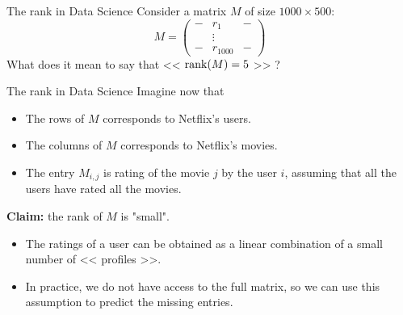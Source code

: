 \documentclass{beamer}
\begin{document}
\begin{frame}[t]{The rank in Data Science}
	\vspace{-0.3cm}
	Consider a matrix $M$ of size $1000 \times 500$:
	$$
	M=
	\begin{pmatrix}
		- & r_1 & - \\
		  & \vdots & \\
		-  & r_{1000} & -
	\end{pmatrix}
	$$
	What does it mean to say that << ${{\rm rank}}(M)=5$ >> ?
\end{frame}
\begin{frame}[t]{The rank in Data Science}
	Imagine now that
	\begin{itemize}
		\item The rows of $M$ corresponds to Netflix's users.
		\item The columns of $M$ corresponds to Netflix's movies.
		\item The entry $M_{i,j}$ is rating of the movie $j$ by the user $i$, assuming that all the users have rated all the movies.
	\end{itemize}
	\vspace{0.5cm}
	\pause

	\begin{center}
	\textbf{Claim:} the rank of $M$ is "small".
	\end{center}
	\vspace{0.5cm}

	\begin{itemize}
		\item The ratings of a user can be obtained as a linear combination of a small number of << profiles >>.
		\item In practice, we do not have access to the full matrix, so we can use this assumption to predict the missing entries.
	\end{itemize}
\end{frame}
\end{document}
